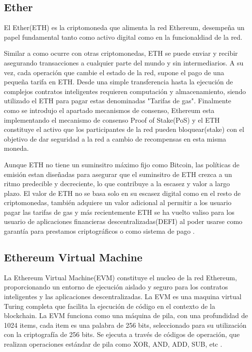 \subsection{Ether}

El Ether(ETH) es la criptomoneda que alimenta la red Ethereum, desempeña un papel fundamental tanto como activo digital como en la funcionaldiad de la red.

Similar a como ocurre con otras criptomonedas, ETH se puede enviar y recibir asegurando transacciones a cualquier parte del mundo y sin intermediarios.
A su vez, cada operación que cambie el estado de la red, supone el pago de una pequeña tarifa en ETH. Desde una simple transferencia hasta la ejecución de complejos contratos inteligentes requieren computación y almacenamiento, siendo utilizado el ETH para pagar estas denominadas "Tarifas de gas".
Finalmente como se introdujo el apartado mecanismos de consenso, Ethereum esta implementando el mecanismo de consenso Proof of Stake(PoS) y el ETH constituye el activo que los participantes de la red pueden bloquear(stake) con el objetivo de dar seguridad a la red a cambio de recompensas en esta misma moneda.

Aunque ETH no tiene un suminsitro máximo fijo como Bitcoin, las políticas de emisión estan diseñadas para asegurar que el suminsitro de ETH crezca a un ritmo predecible y decreciente, lo que contribuye a la escasez y valor a largo plazo.
El valor de ETH no se basa solo en su escasez digital como en el resto de criptomonedas, también adquiere un valor adicional al permitir a los usuario pagar las tarifas de gas y más recientemente ETH se ha vuelto valiso para los usuario de aplicaciones financieras descentralizadas(DEFI) al poder usarse como garantía para prestamos criptográficos o como sistema de pago \cite{QueEsETH}.


\subsection{Ethereum Virtual Machine}

La Ethereum Virtual Machine(EVM) constituye el nucleo de la red Ethereum, proporcionando un entorno de ejecución aislado y seguro para los contratos inteligentes y las aplicaciones descentralizadas. 
La EVM es una maquina virtual Turing completa que facilita la ejecución de código en el contexto de la blockchain.
La EVM funciona como una máquina de pila, con una profundidad de 1024 items, cada item es una palabra de 256 bits, seleccionado para su utilización con la criptografía de 256 bits.
Se ejecuta a través de códigos de operación, que realizan operaciones estándar de pila como XOR, AND, ADD, SUB, etc \cite{QueEsEVM}.

